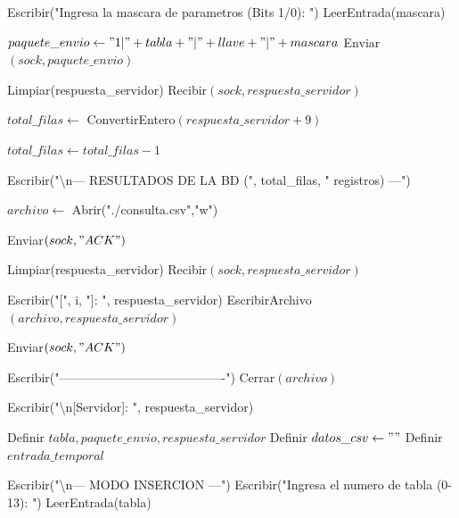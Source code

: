 \begin{tcolorbox}[colback=white, colframe=azul_unam, 
title=Pseudocódigo: cliente.c, breakable]
\begin{algorithmic}[1]
\State Escribir("Ingresa la mascara de parametros (Bits 1/0): ")
\State LeerEntrada(mascara)

\State $paquete\_envio \gets "1|" + tabla + "|" + llave + "|" + mascara$
\State Enviar$(sock, paquete\_envio)$

\State Limpiar(respuesta\_servidor)
\State Recibir$(sock, respuesta\_servidor)$


    \State $total\_filas \gets$ ConvertirEntero$(respuesta\_servidor + 9)$

        \State $total\_filas \gets total\_filas - 1$
    \EndIf

    \State Escribir("\textbackslash n--- RESULTADOS DE LA BD (", total\_filas, " registros) ---")

    \State $archivo \gets$ Abrir("./consulta.csv","w")

    \State Enviar$(sock,"ACK")$


        \State Limpiar(respuesta\_servidor)
        \State Recibir$(sock, respuesta\_servidor)$

        \State Escribir("[", i, "]: ", respuesta\_servidor)
        \State EscribirArchivo$(archivo, respuesta\_servidor)$

        \State Enviar$(sock,"ACK")$

    \EndFor

    \State Escribir("----------------------------------------")
    \State Cerrar$(archivo)$

\Else

    \State Escribir("\textbackslash n[Servidor]: ", respuesta\_servidor)

\EndIf

\EndProcedure

\vspace{0.3cm}



\State Definir $tabla, paquete\_envio, respuesta\_servidor$
\State Definir $datos\_csv \gets ""$
\State Definir $entrada\_temporal$

\State Escribir("\textbackslash n--- MODO INSERCION ---")
\State Escribir("Ingresa el numero de tabla (0-13): ")
\State LeerEntrada(tabla)


\end{algorithmic}
\end{tcolorbox}
